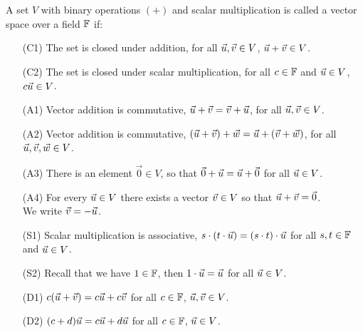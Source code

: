 \begin{defn}
A set $V$ with binary operations $(+)$ and scalar multiplication is called a vector space over a field $\mathbb{F}$ if:
\begin{enumerate}
    \item[(C1)] The set is closed under addition, for all $\vec{u},\vec{v}\in V$, $\vec{u} + \vec{v} \in V$.
    \item[(C2)] The set is closed under scalar multiplication, for all $c\in\mathbb{F}$ and $\vec{u}\in V$, $c\vec{u} \in V$.
    \item[(A1)] Vector addition is commutative, $\vec{u}+\vec{v} = \vec{v} + \vec{u}$, for all $\vec{u},\vec{v} \in V$.
    \item[(A2)] Vector addition is commutative, $(\vec{u}+\vec{v})+\vec{w}=\vec{u}+(\vec{v}+\vec{w})$, for all $\vec{u},\vec{v},\vec{w}\in V$.
    \item[(A3)] There is an element $\Vec{0}\in V$, so that $\vec{0}+\vec{u}=\vec{u}+\vec{0}$ for all $\vec{u}\in V$.
    \item[(A4)] For every $\vec{u}\in V$ there exists a vector $\vec{v}\in V$ so that $\vec{u}+\vec{v}=\vec{0}$.\\
    We write $\vec{v}=-\vec{u}$.
    \item[(S1)] Scalar multiplication is associative, $s\cdot(t\cdot\vec{u})=(s\cdot t)\cdot\vec{u}$ for all $s,t\in \mathbb{F}$ and $\vec{u}\in V$.
    \item[(S2)] Recall that we have $1\in\mathbb{F}$, then $1\cdot \vec{u}=\vec{u}$ for all $\vec{u}\in V$.
    \item[(D1)] $c(\vec{u}+\vec{v})=c\vec{u}+c\vec{v}$ for all $c\in \mathbb{F}$, $\vec{u},\vec{v}\in V$.
    \item[(D2)] $(c+d)\vec{u}=c\vec{u}+d\vec{u}$ for all $c\in\mathbb{F}$, $\vec{u}\in V$.
\end{enumerate}
\end{defn}